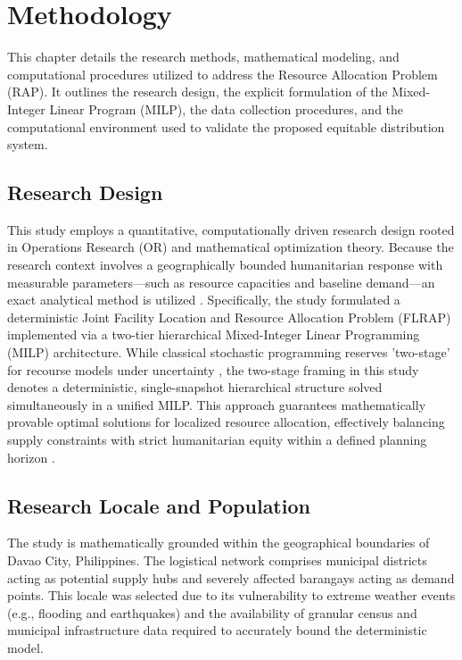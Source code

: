 \chapter{Methodology}

This chapter details the research methods, mathematical modeling, and computational procedures utilized to address the Resource Allocation Problem (RAP). It outlines the research design, the explicit formulation of the Mixed-Integer Linear Program (MILP), the data collection procedures, and the computational environment used to validate the proposed equitable distribution system.

\section{Research Design}
This study employs a quantitative, computationally driven research design rooted in Operations Research (OR) and mathematical optimization theory. Because the research context involves a geographically bounded humanitarian response with measurable parameters—such as resource capacities and baseline demand—an exact analytical method is utilized \cite{van2010using}. Specifically, the study formulated a deterministic Joint Facility Location and Resource Allocation Problem (FLRAP) implemented via a two-tier hierarchical Mixed-Integer Linear Programming (MILP) architecture. While classical stochastic programming reserves 'two-stage' for recourse models under uncertainty \citep{birge2011introduction}, the two-stage framing in this study denotes a deterministic, single-snapshot hierarchical structure solved simultaneously in a unified MILP. This approach guarantees mathematically provable optimal solutions for localized resource allocation, effectively balancing supply constraints with strict humanitarian equity within a defined planning horizon \cite{albadi2024, manggasa2020}.

\section{Research Locale and Population}
The study is mathematically grounded within the geographical boundaries of Davao City, Philippines. The logistical network comprises municipal districts acting as potential supply hubs and severely affected barangays acting as demand points. This locale was selected due to its vulnerability to extreme weather events (e.g., flooding and earthquakes) and the availability of granular census and municipal infrastructure data required to accurately bound the deterministic model.

